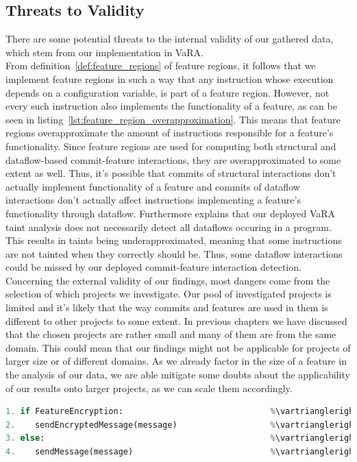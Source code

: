 \subsection*{Threats to Validity}\label{sec:threats}

There are some potential threats to the internal validity of our gathered data, which stem from our implementation in VaRA. \\
From definition~\ref{def:feature_regions} of feature regions, it follows that we implement feature regions in such a way that any instruction whose execution depends on a configuration variable, is part of a feature region.
However, not every such instruction also implements the functionality of a feature, as can be seen in listing~\ref{lst:feature_region_overapproximation}.
This means that feature regions overapproximate the amount of instructions responsible for a feature's functionality.
Since feature regions are used for computing both structural and dataflow-based commit-feature interactions, they are overapproximated to some extent as well.
Thus, it's possible that commits of structural interactions don't actually implement functionality of a feature and commits of dataflow interactions don't actually affect instructions implementing a feature's functionality through dataflow.
Furthermore \citet{sattler2023seal} explains that our deployed VaRA taint analysis does not necessarily detect all dataflows occuring in a program.
This results in taints being underapproximated, meaning that some instructions are not tainted when they correctly should be.
Thus, some dataflow interactions could be missed by our deployed commit-feature interaction detection. \\
Concerning the external validity of our findings, most dangers come from the selection of which projects we investigate.
Our pool of investigated projects is limited and it's likely that the way commits and features are used in them is different to other projects to some extent.
In previous chapters we have discussed that the chosen projects are rather small and many of them are from the same domain.
This could mean that our findings might not be applicable for projects of larger size or of different domains.
As we already factor in the size of a feature in the analysis of our data, we are able mitigate some doubts about the applicability of our results onto larger projects, as we can scale them accordingly. \\

\begin{lstlisting}[language=python, caption={Feature Region Overapproximation}, label={lst:feature_region_overapproximation}]
1. if FeatureEncryption:                              %\vartriangleright% %FeatureEncryption%
2.    sendEncryptedMessage(message)                   %\vartriangleright% %FeatureEncryption%
3. else:                                              %\vartriangleright% %FeatureEncryption%
4.    sendMessage(message)                            %\vartriangleright% %FeatureEncryption%
\end{lstlisting}

